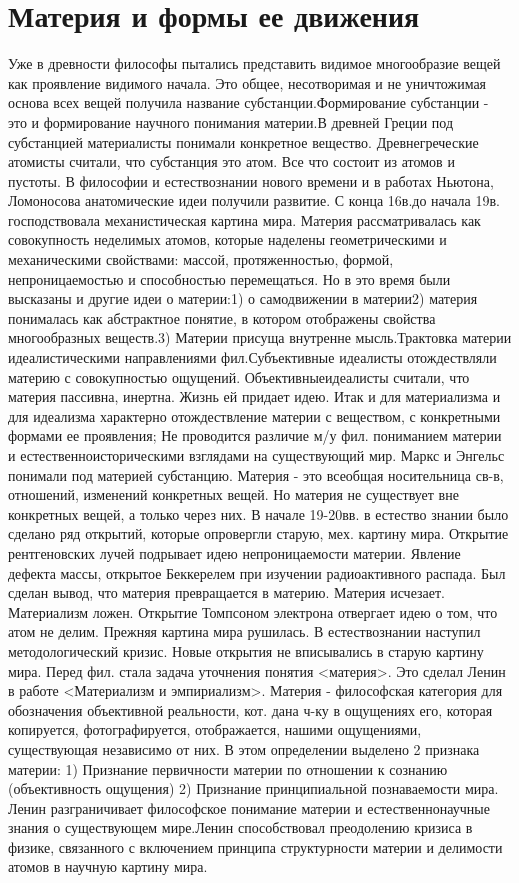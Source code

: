 \documentclass[12pt]{article}
\begin{document}
\section{Материя и формы ее движения}
Уже в древности философы пытались представить  видимое многообразие вещей как проявление видимого
начала.  Это  общее,  несотворимая   и  не  уничтожимая  основа  всех  вещей  получила  название
субстанции.Формирование субстанции - это и формирование научного понимания материи.В древней Греции
под  субстанцией   материалисты  понимали  конкретное  вещество.  Древнегреческие  атомисты  считали,  что
субстанция это атом. Все что состоит из атомов и пустоты. В философии и естествознании нового времени и в
работах Ньютона, Ломоносова анатомические идеи получили развитие.
 С конца 16в.до начала 19в. господствовала механистическая картина мира. Материя рассматривалась  как
совокупность неделимых атомов, которые наделены геометрическими и механическими  свойствами: массой,
протяженностью, формой, непроницаемостью и способностью перемещаться.
Но в это время были высказаны и другие идеи о материи:1) о самодвижении в материи2) материя понималась
как  абстрактное  понятие,  в  котором  отображены  свойства  многообразных   веществ.3)  Материи  присуща
внутренне  мысль.Трактовка  материи  идеалистическими  направлениями   фил.Субъективные  идеалисты
отождествляли материю с совокупностью ощущений. Объективныеидеалисты считали, что материя пассивна,
инертна. Жизнь ей придает идею. Итак и для материализма  и для идеализма характерно отождествление
материи с веществом, с конкретными формами ее проявления; Не проводится различие м/у фил. пониманием
материи  и  естественноисторическими   взглядами  на  существующий  мир.  Маркс  и  Энгельс  понимали  под
материей субстанцию.
  Материя  -  это  всеобщая  носительница  св-в,  отношений,  изменений  конкретных  вещей.   Но  материя  не
существует вне конкретных вещей, а только через них. В начале 19-20вв. в естество знании было сделано ряд
открытий, которые опровергли старую, мех. картину мира. Открытие рентгеновских лучей подрывает идею
непроницаемости  материи.  Явление   дефекта  массы,   открытое  Беккерелем  при  изучении  радиоактивного
распада. Был сделан  вывод, что материя превращается в материю. Материя исчезает. Материализм ложен.
Открытие Томпсоном электрона отвергает идею о том, что атом не делим. Прежняя картина мира рушилась. В
естествознании наступил методологический кризис. Новые открытия не вписывались в старую картину мира.
Перед фил. стала задача уточнения понятия <материя>.
  Это  сделал  Ленин  в  работе  <Материализм  и  эмпириализм>.   Материя    -  философская  категория   для
обозначения объективной реальности, кот. дана ч-ку в ощущениях его, которая копируется, фотографируется,
отображается, нашими ощущениями,  существующая независимо  от  них.   В  этом  определении выделено 2
признака материи:
1) Признание первичности материи по отношении к сознанию (объективность ощущения) 
2) Признание принципиальной познаваемости мира. Ленин разграничивает философское понимание материи и
естественнонаучные  знания   о  существующем  мире.Ленин  способствовал  преодолению  кризиса  в  физике,
связанного с включением принципа структурности материи и делимости атомов в научную картину мира.
\end{document}
